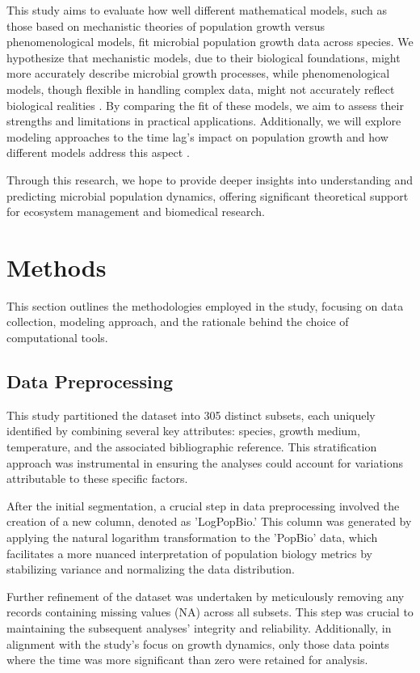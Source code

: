 \documentclass[11pt]{article}
\begin{document}
This study aims to evaluate how well different mathematical models, such as those based on mechanistic theories of population growth versus phenomenological models, fit microbial population growth data across species. We hypothesize that mechanistic models, due to their biological foundations, might more accurately describe microbial growth processes, while phenomenological models, though flexible in handling complex data, might not accurately reflect biological realities \cite{Levins1966}\cite{Johnson2004}. By comparing the fit of these models, we aim to assess their strengths and limitations in practical applications. Additionally, we will explore modeling approaches to the time lag's impact on population growth and how different models address this aspect \cite{baranyi1994dynamic}\cite{Bolker2013}.

\hfill\break
Through this research, we hope to provide deeper insights into understanding and predicting microbial population dynamics, offering significant theoretical support for ecosystem management and biomedical research.

\section{Methods}

This section outlines the methodologies employed in the study, focusing on data collection, modeling approach, and the rationale behind the choice of computational tools.

\subsection{Data Preprocessing}

This study partitioned the dataset into 305 distinct subsets, each uniquely identified by combining several key attributes: species, growth medium, temperature, and the associated bibliographic reference. This stratification approach was instrumental in ensuring the analyses could account for variations attributable to these specific factors.

\hfill\break
After the initial segmentation, a crucial step in data preprocessing involved the creation of a new column, denoted as 'LogPopBio.' This column was generated by applying the natural logarithm transformation to the 'PopBio' data, which facilitates a more nuanced interpretation of population biology metrics by stabilizing variance and normalizing the data distribution.

\hfill\break
Further refinement of the dataset was undertaken by meticulously removing any records containing missing values (NA) across all subsets. This step was crucial to maintaining the subsequent analyses' integrity and reliability. Additionally, in alignment with the study's focus on growth dynamics, only those data points where the time was more significant than zero were retained for analysis. 
\end{document}
